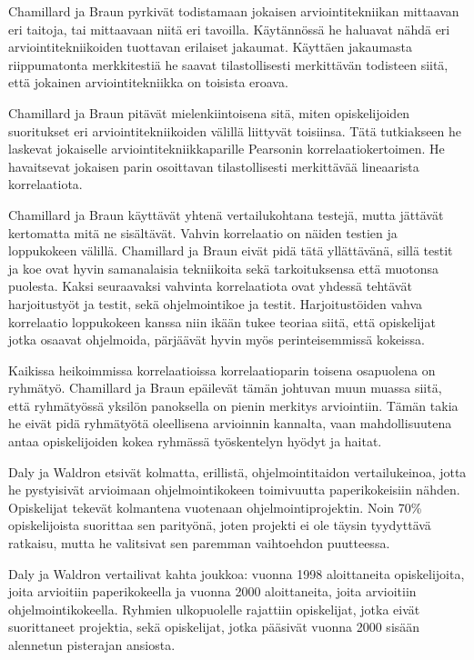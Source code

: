\documentclass[finnish]{../tktltiki2}
\theoremstyle{definition}
\theoremstyle{remark}
\begin{document}
Chamillard ja Braun pyrkivät todistamaan jokaisen arviointitekniikan mittaavan eri taitoja, tai mittaavaan niitä eri tavoilla. Käytännössä he haluavat nähdä eri arviointitekniikoiden tuottavan erilaiset jakaumat. Käyttäen jakaumasta riippumatonta merkkitestiä he saavat tilastollisesti merkittävän todisteen siitä, että jokainen arviointitekniikka on toisista eroava.

Chamillard ja Braun pitävät mielenkiintoisena sitä, miten opiskelijoiden suoritukset eri arviointitekniikoiden välillä liittyvät toisiinsa. Tätä tutkiakseen he laskevat jokaiselle arviointitekniikkaparille Pearsonin korrelaatiokertoimen. He havaitsevat jokaisen parin osoittavan tilastollisesti merkittävää lineaarista korrelaatiota.

Chamillard ja Braun käyttävät yhtenä vertailukohtana testejä, mutta jättävät kertomatta mitä ne sisältävät. Vahvin korrelaatio on näiden testien ja loppukokeen välillä. Chamillard ja Braun eivät pidä tätä yllättävänä, sillä testit ja koe ovat hyvin samanalaisia tekniikoita sekä tarkoituksensa että muotonsa puolesta. Kaksi seuraavaksi vahvinta korrelaatiota ovat yhdessä tehtävät harjoitustyöt ja testit, sekä ohjelmointikoe ja testit. Harjoitustöiden vahva korrelaatio loppukokeen kanssa niin ikään tukee teoriaa siitä, että opiskelijat jotka osaavat ohjelmoida, pärjäävät hyvin myös perinteisemmissä kokeissa.

Kaikissa heikoimmissa korrelaatioissa korrelaatioparin toisena osapuolena on ryhmätyö. Chamillard ja Braun epäilevät tämän johtuvan muun muassa siitä, että ryhmätyössä yksilön panoksella on pienin merkitys arviointiin. Tämän takia he eivät pidä ryhmätyötä oleellisena arvioinnin kannalta, vaan mahdollisuutena antaa opiskelijoiden kokea ryhmässä työskentelyn hyödyt ja haitat.

Daly ja Waldron etsivät kolmatta, erillistä, ohjelmointitaidon vertailukeinoa, jotta he pystyisivät arvioimaan ohjelmointikokeen toimivuutta paperikokeisiin nähden. Opiskelijat tekevät kolmantena vuotenaan ohjelmointiprojektin. Noin 70\% opiskelijoista suorittaa sen parityönä, joten projekti ei ole täysin tyydyttävä ratkaisu, mutta he valitsivat sen paremman vaihtoehdon puutteessa.

Daly ja Waldron vertailivat kahta joukkoa: vuonna 1998 aloittaneita opiskelijoita, joita arvioitiin paperikokeella ja vuonna 2000 aloittaneita, joita arvioitiin ohjelmointikokeella. Ryhmien ulkopuolelle rajattiin opiskelijat, jotka eivät suorittaneet projektia, sekä opiskelijat, jotka pääsivät vuonna 2000 sisään alennetun pisterajan ansiosta.
\end{document}
